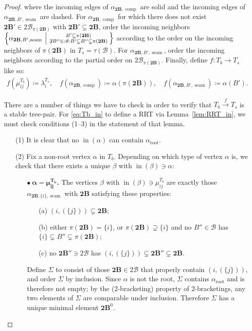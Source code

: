 \documentclass[11pt]{amsart}
\theoremstyle{definition}
\theoremstyle{remark}
\theoremstyle{plain}
\newcommand{\btB}{{\mathbf{2B}}}
\newcommand{\sB}{\mathscr{B}}
\newcommand{\stB}{2\mathscr{B}}
\newcommand{\on}{\operatorname}
\newcommand{\comp}{C^2}
\renewcommand{\comp}{{\on{comp}}}
\newcommand{\seam}{{\on{seam}}}
\newcommand{\incom}{\on{in}}
\renewcommand{\root}{{\on{root}}}
\newcommand{\sr}{\stackrel}
\begin{document}
\begin{proof}
where the incoming edges of $\alpha_{\btB,\comp}$ are solid and the incoming edges of $\alpha_{\btB,B',\seam}$ are dashed.
For $\alpha_{\btB,\comp}$ for which there does not exist $\btB' \in \stB_{\pi(\btB)}$ with $\btB' \subsetneq \btB$, order the incoming neighbors $\left\{\alpha_{\btB,B',\seam} \:\left|\: {{B' \subsetneq \pi(\btB)}\atop{\not\exists B'' \in \sB: B' \subsetneq B'' \subsetneq \pi(\btB)}}\right.\right\}$ according to the order on the incoming neighbors of $\pi(\btB)$ in $T_s = \tau(\sB)$.
For $\alpha_{\btB,B',\seam}$, order the incoming neighbors according to the partial order on $\stB_{\pi(\btB)}$.
Finally, define $f\colon T_b \to T_s$ like so:
\begin{gather}
f(\mu_{ij}^{T_b}) \coloneqq \lambda_i^{T_s},
\quad
f(\alpha_{\btB,\comp}) \coloneqq \alpha(\pi(\btB)),
\quad
f(\alpha_{\btB,B',\seam}) \coloneqq \alpha(B').
\end{gather}

There are a number of things we have to check in order to verify that $T_b \sr{f}{\to} T_s$ is a stable tree-pair.
For \eqref{eq:Tb_in} to define a RRT via Lemma~\ref{lem:RRT_in}, we must check conditions (1--3) in the statement of that lemma.
\begin{itemize}
\item[(1)] It is clear that no $\incom(\alpha)$ can contain $\alpha_\root$.

\item[(2)] Fix a non-root vertex $\alpha$ in $T_b$.
Depending on which type of vertex $\alpha$ is, we check that there exists a unique $\beta$ with $\incom(\beta) \ni \alpha$:
\begin{itemize}
\item[] {\bf $\bullet \: \mathbf{\alpha = \mu_{ij}^{T_b}}$.} The vertices $\beta$ with $\incom(\beta) \ni \mu_{ij}^{T_b}$ are exactly those $\alpha_{\btB,\{i\},\seam}$ with $\btB$ satisfying these properties:
\begin{itemize}
\item[(a)] $(i,(\{j\})) \subsetneq \btB$;

\item[(b)] either $\pi(\btB) = \{i\}$, or $\pi(\btB) \supsetneq \{i\}$ and no $B'' \in \sB$ has $\{i\} \subsetneq B'' \subsetneq \pi(\btB)$;

\item[(c)] no $\btB'' \ni \stB$ has $(i,(\{j\})) \subsetneq \btB'' \subsetneq \btB$.
\end{itemize}
Define $\Sigma$ to consist of those $\btB \in \stB$ that properly contain $(i,(\{j\}))$, and order $\Sigma$ by inclusion.
Since $\alpha$ is not the root, $\Sigma$ contains $\alpha_\root$ and is therefore not empty; by the {\sc(2-bracketing)} property of 2-bracketings, any two elements of $\Sigma$ are comparable under inclusion.
Therefore $\Sigma$ has a unique minimal element $\btB^0$.


\end{itemize}
\end{itemize}
\end{proof}
\end{document}
